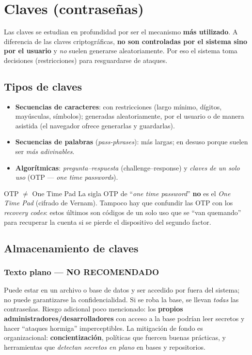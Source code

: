 \documentclass[11pt,a4paper]{article}
\begin{document}
\section{Claves (contraseñas)}

Las claves se estudian en profundidad por ser el mecanismo \textbf{más utilizado}. A
diferencia de las claves criptográficas, \textbf{no son controladas por el sistema sino por
el usuario} y \emph{no} suelen generarse aleatoriamente. Por eso el sistema toma decisiones
(restricciones) para resguardarse de ataques.

\subsection{Tipos de claves}
\begin{itemize}[leftmargin=1.4em,itemsep=2pt]
  \item \textbf{Secuencias de caracteres}: con restricciones (largo mínimo, dígitos,
        mayúsculas, símbolos); generadas aleatoriamente, por el usuario o de manera asistida
        (el navegador ofrece generarlas y guardarlas).
  \item \textbf{Secuencias de palabras} (\emph{pass-phrases}): más largas; en desuso porque
        suelen ser \emph{más adivinables}.
  \item \textbf{Algorítmicas}:
        \emph{pregunta--respuesta} (challenge--response) y
        \emph{claves de un solo uso} (OTP — \emph{one time passwords}).
\end{itemize}

\begin{warnbox}{OTP $\neq$ One Time Pad}
La sigla OTP de ``\emph{one time password}'' \textbf{no} es el \emph{One Time Pad} (cifrado
de Vernam). Tampoco hay que confundir las OTP con los \emph{recovery codes}: estos últimos
son códigos de un solo uso que se ``van quemando'' para recuperar la cuenta si se pierde el
dispositivo del segundo factor.
\end{warnbox}

\subsection{Almacenamiento de claves}

\subsubsection{Texto plano — \textcolor{attackRed}{NO RECOMENDADO}}
Puede estar en un archivo o base de datos y ser accedido por fuera del sistema; no puede
garantizarse la confidencialidad. Si se roba la base, se llevan \emph{todas} las contraseñas.
Riesgo adicional poco mencionado: los \textbf{propios administradores/desarrolladores} con
acceso a la base podrían leer secretos y hacer ``ataques hormiga'' imperceptibles. La
mitigación de fondo es organizacional: \textbf{concientización}, políticas que fuercen
buenas prácticas, y herramientas que \emph{detectan secretos en plano} en bases y
repositorios.
\end{document}
